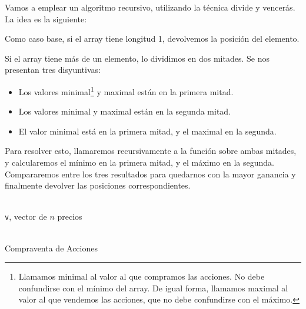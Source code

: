 \documentclass[a4paper, 11pt]{article} %
\begin{document}
	Vamos a emplear un algoritmo recursivo, utilizando la técnica divide y vencerás. 
	La idea es la siguiente: 
	
	Como caso base, si el array tiene longitud 1, devolvemos la posición del elemento. 
	
	Si el array tiene más de un elemento, lo dividimos en dos mitades. Se nos presentan tres disyuntivas:
	\begin{itemize}
		\item Los valores minimal\footnote[1]{Llamamos minimal al valor al que compramos las acciones. No debe confundirse con el mínimo del array. De igual forma, llamamos maximal al valor al que vendemos las acciones, que no debe confundirse con el máximo.}
			 y maximal están en la primera mitad.
		\item Los valores minimal y maximal están en la segunda mitad. 
		\item El valor minimal está en la primera mitad, y el maximal en la segunda. 
	\end{itemize}
	
	Para resolver esto, llamaremos recursivamente a la función sobre ambas mitades, y calcularemos el mínimo en la primera mitad, y el máximo en la segunda. Compararemos entre los tres resultados para quedarnos con la mayor ganancia y finalmente devolver las posiciones correspondientes. 
	
	\begin{algorithm}[H]
		\begin{algorithmic}[1]
			\REQUIRE \ \\
				\texttt{v}, vector de $n$ precios\\\
			\ELSE
				\STATE{Calculamos \texttt{(min,max)} de \texttt{v}}
			\ENDIF
			\end{algorithmic}
		\caption{Compraventa de Acciones}
		\label{algoritmo}
	\end{algorithm}
\end{document}

